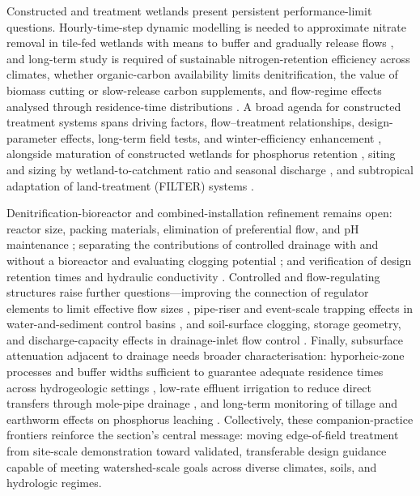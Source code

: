 Constructed and treatment wetlands present persistent performance-limit
questions. Hourly-time-step dynamic modelling is needed to approximate nitrate
removal in tile-fed wetlands with means to buffer and gradually release flows
\parencite{Tanner2011}, and long-term study is required of sustainable
nitrogen-retention efficiency across climates, whether organic-carbon
availability limits denitrification, the value of biomass cutting or slow-release
carbon supplements, and flow-regime effects analysed through residence-time
distributions \parencite{Tanner2005,Tanner2003,Tanner2005b}. A broad agenda for
constructed treatment systems spans driving factors, flow--treatment
relationships, design-parameter effects, long-term field tests, and
winter-efficiency enhancement \parencite{Mendes2021}, alongside maturation of
constructed wetlands for phosphorus retention \parencite{Mendes2020}, siting and
sizing by wetland-to-catchment ratio and seasonal discharge
\parencite{Steidl2019,Tournebize2017}, and subtropical adaptation of
land-treatment (FILTER) systems \parencite{Gardner2001}.

Denitrification-bioreactor and combined-installation refinement remains open:
reactor size, packing materials, elimination of preferential flow, and pH
maintenance \parencite{Aide2016}; separating the contributions of controlled
drainage with and without a bioreactor and evaluating clogging potential
\parencite{Husk2017}; and verification of design retention times and hydraulic
conductivity \parencite{Feyereisen2015}. Controlled and flow-regulating
structures raise further questions---improving the connection of regulator
elements to limit effective flow sizes \parencite{Popek2021}, pipe-riser and
event-scale trapping effects in water-and-sediment control basins
\parencite{Gupta2019}, and soil-surface clogging, storage geometry, and
discharge-capacity effects in drainage-inlet flow control \parencite{Nédélec2010}.
Finally, subsurface attenuation adjacent to drainage needs broader
characterisation: hyporheic-zone processes and buffer widths sufficient to
guarantee adequate residence times across hydrogeologic settings
\parencite{Puckett2005}, low-rate effluent irrigation to reduce direct transfers
through mole-pipe drainage \parencite{Monaghan2007}, and long-term monitoring of
tillage and earthworm effects on phosphorus leaching \parencite{Ulén2018}.
Collectively, these companion-practice frontiers reinforce the section's central
message: moving edge-of-field treatment from site-scale demonstration toward
validated, transferable design guidance capable of meeting watershed-scale goals
across diverse climates, soils, and hydrologic regimes.